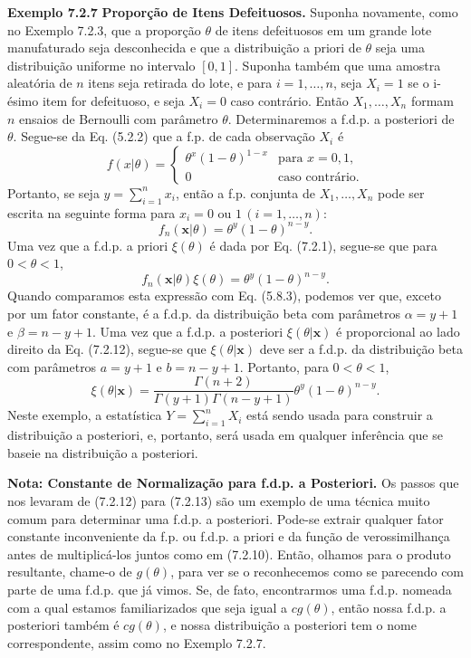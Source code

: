 \vspace{1cm}
\noindent\textbf{Exemplo 7.2.7} \quad \textbf{Proporção de Itens Defeituosos.} Suponha novamente, como no Exemplo 7.2.3, que a proporção $\theta$ de itens defeituosos em um grande lote manufaturado seja desconhecida e que a distribuição a priori de $\theta$ seja uma distribuição uniforme no intervalo $[0, 1]$. Suponha também que uma amostra aleatória de $n$ itens seja retirada do lote, e para $i=1, \dots, n$, seja $X_i=1$ se o i-ésimo item for defeituoso, e seja $X_i=0$ caso contrário. Então $X_1, \dots, X_n$ formam $n$ ensaios de Bernoulli com parâmetro $\theta$. Determinaremos a f.d.p. a posteriori de $\theta$.
Segue-se da Eq. (5.2.2) que a f.p. de cada observação $X_i$ é
$$ f(x|\theta) = 
\begin{cases}
\theta^x(1-\theta)^{1-x} & \text{para } x=0, 1, \\
0 & \text{caso contrário.}
\end{cases}
$$
Portanto, se seja $y=\sum_{i=1}^{n}x_i$, então a f.p. conjunta de $X_1, \dots, X_n$ pode ser escrita na seguinte forma para $x_i=0$ ou $1 \, (i=1, \dots, n)$:
\begin{equation}
f_n(\mathbf{x}|\theta) = \theta^y(1-\theta)^{n-y}. \tag{7.2.11}
\end{equation}
Uma vez que a f.d.p. a priori $\xi(\theta)$ é dada por Eq. (7.2.1), segue-se que para $0 < \theta < 1$,
\begin{equation}
f_n(\mathbf{x}|\theta)\xi(\theta) = \theta^y(1-\theta)^{n-y}. \tag{7.2.12}
\end{equation}
Quando comparamos esta expressão com Eq. (5.8.3), podemos ver que, exceto por um fator constante, é a f.d.p. da distribuição beta com parâmetros $\alpha = y+1$ e $\beta = n-y+1$. Uma vez que a f.d.p. a posteriori $\xi(\theta|\mathbf{x})$ é proporcional ao lado direito da Eq. (7.2.12), segue-se que $\xi(\theta|\mathbf{x})$ deve ser a f.d.p. da distribuição beta com parâmetros $a=y+1$ e $b=n-y+1$. Portanto, para $0 < \theta < 1$,
\begin{equation}
\xi(\theta|\mathbf{x}) = \frac{\Gamma(n+2)}{\Gamma(y+1)\Gamma(n-y+1)}\theta^y(1-\theta)^{n-y}. \tag{7.2.13}
\end{equation}
Neste exemplo, a estatística $Y = \sum_{i=1}^{n}X_i$ está sendo usada para construir a distribuição a posteriori, e, portanto, será usada em qualquer inferência que se baseie na distribuição a posteriori.

\vspace{1cm}
\noindent\textbf{Nota: Constante de Normalização para f.d.p. a Posteriori.} Os passos que nos levaram de (7.2.12) para (7.2.13) são um exemplo de uma técnica muito comum para determinar uma f.d.p. a posteriori. Pode-se extrair qualquer fator constante inconveniente da f.p. ou f.d.p. a priori e da função de verossimilhança antes de multiplicá-los juntos como em (7.2.10). Então, olhamos para o produto resultante, chame-o de $g(\theta)$, para ver se o reconhecemos como se parecendo com parte de uma f.d.p. que já vimos. Se, de fato, encontrarmos uma f.d.p. nomeada com a qual estamos familiarizados que seja igual a $cg(\theta)$, então nossa f.d.p. a posteriori também é $cg(\theta)$, e nossa distribuição a posteriori tem o nome correspondente, assim como no Exemplo 7.2.7.

